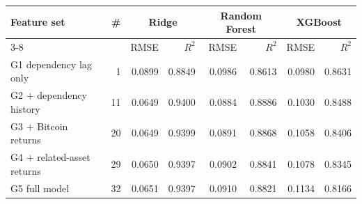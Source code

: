 \begin{tabular}{lrrrrrrr}
    \toprule
    Feature set & \# & \multicolumn{2}{c}{Ridge} & \multicolumn{2}{c}{Random Forest} & \multicolumn{2}{c}{XGBoost} \\
    \cmidrule(lr){3-8}
     &  & RMSE & $R^2$ & RMSE & $R^2$ & RMSE & $R^2$ \\
    \midrule
    G1 dependency lag only & 1 & 0.0899 & 0.8849 & 0.0986 & 0.8613 & 0.0980 & 0.8631 \\
    G2 $+$ dependency history & 11 & 0.0649 & 0.9400 & 0.0884 & 0.8886 & 0.1030 & 0.8488 \\
    G3 $+$ Bitcoin returns & 20 & 0.0649 & 0.9399 & 0.0891 & 0.8868 & 0.1058 & 0.8406 \\
    G4 $+$ related-asset returns & 29 & 0.0650 & 0.9397 & 0.0902 & 0.8841 & 0.1078 & 0.8345 \\
    G5 full model & 32 & 0.0651 & 0.9397 & 0.0910 & 0.8821 & 0.1134 & 0.8166 \\
    \bottomrule
\end{tabular}
